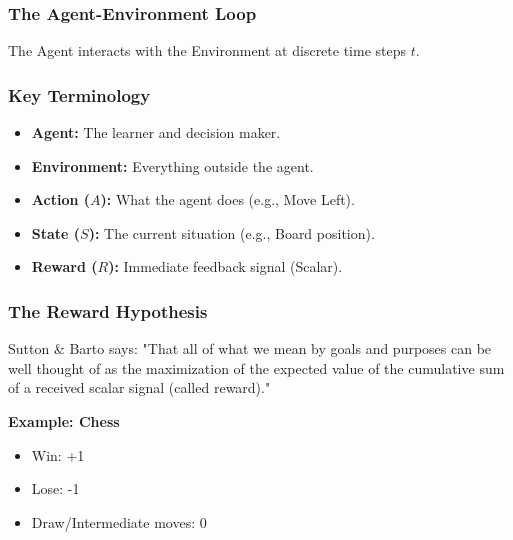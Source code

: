 \documentclass[aspectratio=169]{beamer}
\begin{document}
\begin{frame}
    \frametitle{The Agent-Environment Loop}
    \centering
    \vspace{0.5cm}

    The Agent interacts with the Environment at discrete time steps $t$.
\end{frame}

\begin{frame}
    \frametitle{Key Terminology}
    \begin{itemize}
        \item \textbf{Agent:} The learner and decision maker.
        \item \textbf{Environment:} Everything outside the agent.
        \item \textbf{Action ($A$):} What the agent does (e.g., Move Left).
        \item \textbf{State ($S$):} The current situation (e.g., Board position).
        \item \textbf{Reward ($R$):} Immediate feedback signal (Scalar).
    \end{itemize}
\end{frame}

\begin{frame}
    \frametitle{The Reward Hypothesis}
    \begin{block}{Sutton \& Barto says:}
        "That all of what we mean by goals and purposes can be well thought of as the maximization of the expected value of the cumulative sum of a received scalar signal (called reward)."
    \end{block}
    \vspace{0.5cm}
    \textbf{Example: Chess}
    \begin{itemize}
        \item Win: +1
        \item Lose: -1
        \item Draw/Intermediate moves: 0
    \end{itemize}
\end{frame}
\end{document}
